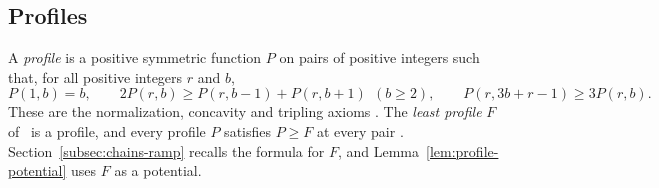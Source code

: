 \subsection{Profiles}
\label{subsec:prelim-profiles}

A \emph{profile} \citep[Definition~3.1]{FinCon26} is a positive symmetric
function \(P\) on pairs of positive integers such that, for all positive
integers \(r\) and \(b\),
\[
 P(1,b)=b,\qquad
 2P(r,b)\ge P(r,b-1)+P(r,b+1)\ \ (b\ge2),\qquad
 P(r,3b+r-1)\ge3P(r,b).
\]
These are the normalization, concavity and tripling axioms
\citep[(3.1)--(3.3)]{FinCon26}. The \emph{least profile} \(F\)
of~\citep[(3.4)]{FinCon26} is a profile, and every profile \(P\) satisfies
\(P\ge F\) at every pair \citep[Theorem~3.2]{FinCon26}.
Section~\ref{subsec:chains-ramp} recalls the formula for \(F\), and
Lemma~\ref{lem:profile-potential} uses \(F\) as a potential.
